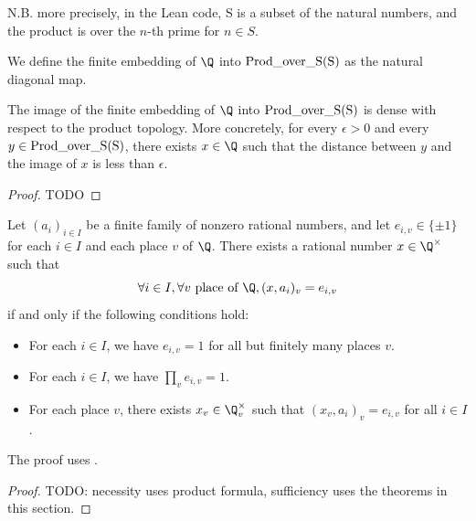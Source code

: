 N.B. more precisely, in the Lean code, S is a subset of the natural numbers, and the product is
over the $n$-th prime for $n \in S$.

\begin{definition}
	\label{def:finite_embedding}
	\leanok
We define the finite embedding of $\Q$ into $\rm{Prod\_over\_S} (S)$ as the natural diagonal map.
\end{definition}

\begin{theorem}\label{thm:approximation}%
	\leanok
	The image of the finite embedding of $\Q$ into $\rm{Prod\_over\_S} (S)$ is dense with respect to
	the product topology. More concretely, for every $\epsilon > 0$ and every
	$y \in \rm{Prod\_over\_S} (S)$, there exists $x \in \Q$ such that the distance
	between $y$ and the image of $x$ is less than $\epsilon$.
\end{theorem}
\begin{proof}
	TODO
\end{proof}


\begin{theorem}\label{thm:existence}
	\leanok
	Let $(a_i)_{i \in I}$ be a finite family of nonzero rational numbers, and let
	$e_{i,v} \in \{\pm 1\}$ for each $i \in I$ and each place $v$ of $\Q$. There exists a rational
	number $x \in \Q^\times$ such that
	\[
	\forall i \in I, \forall v \text{ place of } \Q, (x,a_i)_v=e_{i,v}
	\]
	if and only if the following conditions hold:
	\begin{itemize}
		\item For each $i \in I$, we have $e_{i,v}=1$ for all but finitely many places $v$.
		\item For each $i \in I$, we have $\prod_v e_{i,v}=1$.
		\item For each place $v$, there exists $x_v \in \Q_v^\times$ such that
		$(x_v, a_i)_v = e_{i,v}$ for all $i \in I$.
	\end{itemize}
\end{theorem}

The proof uses .

\begin{proof}
TODO: necessity uses product formula, sufficiency uses the theorems in this section.
\end{proof}
